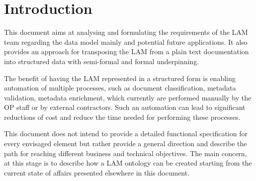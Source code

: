 \section{Introduction}\label{ariaid-title13}

This document aims at analysing and formulating the requirements of the
LAM team regarding the data model mainly and potential future
applications. It also provides an approach for transposing the LAM from
a plain text documentation into structured data with semi-formal and
formal underpinning.

The benefit of having the LAM represented in a structured form is
enabling automation of multiple processes, such as document
classification, metadata validation, metadata enrichment, which
currently are performed manually by the OP staff or by external
contractors. Such an automation can lead to significant reductions of
cost and reduce the time needed for performing these processes.

This document does not intend to provide a detailed functional
specification for every envisaged element but rather provide a general
direction and describe the path for reaching different business and
technical objectives. The main concern, at this stage is to describe how
a LAM ontology can be created starting from the current state of affairs
presented elsewhere in this document.
